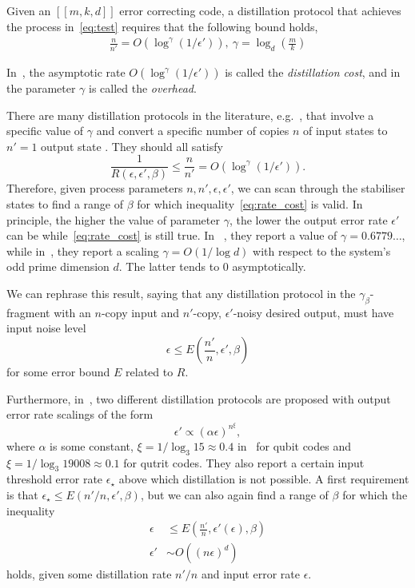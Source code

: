 \documentclass[pra,
aps,
twocolumn,
superscriptaddress,
groupedaddress,
nofootinbib,
reprint
]{revtex4-1}
\begin{document}
Given an $[[m,k,d]]$ error correcting code, a distillation protocol that achieves the process in~\cref{eq:test} requires that the following bound holds,
\begin{align}
	\frac{n}{n'} = O(\log^\gamma{(1/\epsilon')}),\ \gamma = \log_d{\left(\frac{m}{k}\right)}
\end{align}

In~\cite{Bravyi2012,Hastings2018}, the asymptotic rate $O(\log^\gamma{(1/\epsilon')})$ is called the \emph{distillation cost}, and in~\cite{cit:bravyi,Krishna2019} the parameter $\gamma$ is called the \emph{overhead}.

There are many distillation protocols in the literature, e.g.~\cite{Bravyi2012,Hastings2018}, that involve a specific value of $\gamma$ and convert a specific number of copies $n$ of input states to $n'=1$ output state .
They should all satisfy
\begin{equation}\label{eq:rate_cost}
	\frac{1}{R(\epsilon, \epsilon', \beta)} \leq \frac{n}{n'} = O(\log^\gamma{(1/\epsilon')}).
\end{equation}
Therefore, given process parameters $n, n', \epsilon, \epsilon'$, we can scan through the stabiliser states to find a range of $\beta$ for which inequality~\cref{eq:rate_cost} is valid.
In principle, the higher the value of parameter $\gamma$, the lower the output error rate $\epsilon'$ can be while~\cref{eq:rate_cost} is still true.
In~\cite{Hastings2018} , they report a value of $\gamma = 0.6779\dots$, while in~\cite{Krishna2019}, they report a scaling $\gamma = O(1/\log{d})$ with respect to the system's odd prime dimension $d$.
The latter tends to 0 asymptotically.

We can rephrase this result, saying that any distillation protocol in the $\gamma_\beta$-fragment with an $n$-copy input and $n'$-copy, $\epsilon'$-noisy desired output, must have input noise level 
\begin{equation}
	\epsilon \leq  E\left(\frac{n'}{n}, \epsilon', \beta \right)
\end{equation}
for some error bound $E$ related to $R$.

Furthermore, in~\cite{cit:bravyi,cit:prakash}, two different distillation protocols are proposed with output error rate scalings of the form 
\begin{equation}
	\epsilon' \propto (\alpha \epsilon)^{n^\xi},
\end{equation}
where $\alpha$ is some constant, $\xi = 1/\log_3{15} \approx 0.4$ in~\cite{cit:bravyi} for qubit codes and $\xi = 1/\log_3{19008} \approx 0.1$ for qutrit codes.
They also report a certain input threshold error rate $\epsilon_\star$ above which distillation is not possible.
A first requirement is that $\epsilon_\star \leq E(n'/n, \epsilon', \beta)$, but we can also again find a range of $\beta$ for which the inequality
\begin{align}
	\epsilon &\leq E\left(\frac{n'}{n}, \epsilon'(\epsilon), \beta \right) \\
	\epsilon' &\sim O\left((n\epsilon)^d\right)
\end{align}
holds, given some distillation rate $n'/n$ and input error rate $\epsilon$.
\end{document}
